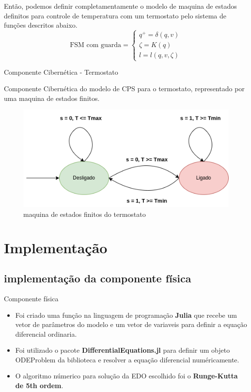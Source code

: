 \documentclass{beamer}
\begin{document}
\begin{frame}
	\par Então, podemos definir completamentamente o modelo de maquina de estados definitos para controle de temperatura com um termostato pelo sistema de funções descritos abaixo.
	\begin{equation}
		\text{FSM com guarda} =
		\begin{cases}
			q^{+}=\delta(q,v)\\
			\zeta = K(q)\\
			l = l(q,v,\zeta)
		\end{cases}
	\end{equation}
\end{frame}

\begin{frame}{Componente Cibernética - Termostato}
		\par Componente Cibernética do modelo de CPS para o termostato, representado por uma maquina de estados finitos.
	\begin{figure}
		\centering
		\includegraphics[width=.75\textwidth]{fsm_termostato.png}
		\caption{maquina de estados finitos do termostato}
		\label{fig:fsm}
	\end{figure}
\end{frame}

\section{Implementação}

\subsection{implementação da componente física}
\begin{frame}{Componente física}
	\begin{itemize}
		\item Foi criado uma função na linguagem de programação \textbf{Julia} que recebe um vetor de parâmetros do modelo e um vetor de variaveis para definir a equação diferencial ordinaria.
		\item Foi utilizado o pacote \textbf{DifferentialEquations.jl} para definir um objeto ODEProblem da biblioteca e resolver a equação diferencial numéricamente.
		\item O algoritmo númerico para solução da EDO escolhido foi o \textbf{Runge-Kutta de 5th ordem}.
	\end{itemize}
\end{frame}
\end{document}
